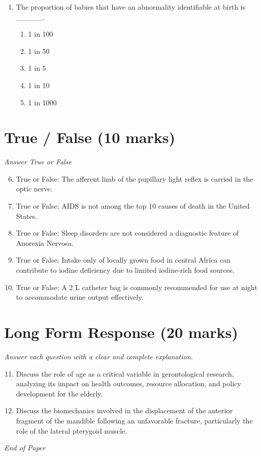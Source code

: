 \documentclass[12pt]{article}
\begin{document}
\begin{enumerate}[label=\arabic*.]
\begin{enumerate}[label=(\alph*)]
    \item Increase memory and intelligence
    \item Produce emotional stability
    \item Reduce allergic reactions
\end{enumerate}
\item The proportion of babies that have an abnormality identifiable at birth is \_\_\_\_\_.
\begin{enumerate}[label=(\alph*)]
    \item 1 in 100
    \item 1 in 50
    \item 1 in 5
    \item 1 in 10
    \item 1 in 1000
\end{enumerate}
\end{enumerate}

\section*{True / False (10 marks)}
\textit{Answer True or False}
\begin{enumerate}[label=\arabic*.]
\setcounter{enumi}{5}
\item True or False: The afferent limb of the pupillary light reflex is carried in the optic nerve.
\item True or False: AIDS is not among the top 10 causes of death in the United States.
\item True or False: Sleep disorders are not considered a diagnostic feature of Anorexia Nervosa.
\item True or False: Intake only of locally grown food in central Africa can contribute to iodine deficiency due to limited iodine-rich food sources.
\item True or False: A 2 L catheter bag is commonly recommended for use at night to accommodate urine output effectively.
\end{enumerate}

\section*{Long Form Response (20 marks)}
\textit{Answer each question with a clear and complete explanation.}
\begin{enumerate}[label=\arabic*.]
\setcounter{enumi}{10}
\item Discuss the role of age as a critical variable in gerontological research, analyzing its impact on health outcomes, resource allocation, and policy development for the elderly.
\item Discuss the biomechanics involved in the displacement of the anterior fragment of the mandible following an unfavorable fracture, particularly the role of the lateral pterygoid muscle.
\end{enumerate}

\vfill
\noindent\textit{End of Paper}
\end{document}
